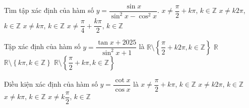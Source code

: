 \begin{ex}%
	Tìm tập  xác định của hàm số $y=\dfrac{\sin x}{\sin ^2x-\cos ^2x}$.
	\choice 
		{$x\ne \dfrac{\pi}{2}+k\pi$,  $k\in \mathbb{Z}$}
		 {$x\ne k2\pi$, $k\in \mathbb{Z}$}
		{$x\ne k\pi$,  $k\in \mathbb{Z}$}
		{\True $x\ne \dfrac{\pi}{4}+\dfrac{k\pi}{2}$, $k\in \mathbb{Z}$} 
\end{ex}

\begin{ex}%
	Tập  xác định của hàm số $y=\dfrac{\tan x+2025}{\sin ^2x+1}$ là
	\choice 
		 {$\mathbb{R}\setminus \left\{\dfrac{\pi}{2}+k2\pi, k\in\mathbb{Z}\right\}$}
		{\True  $\mathbb{R}$}
		{$\mathbb{R}\setminus  \left\{k\pi, k\in\mathbb{Z}\right\}$}
		 {$\mathbb{R}\setminus \left\{\dfrac{\pi}{2}+k\pi, k\in \mathbb{Z}\right\}$}
\end{ex}

\begin{ex}%
	Điều kiện xác định của  hàm số $y=\dfrac{\cot x}{\cos x}$ là
	\choice 
		{$x\ne \dfrac{\pi}{2}+k\pi$, $k\in  \mathbb{Z}$}
		{$x\ne k2\pi$, $k\in \mathbb{Z}$} 
		 {$x\ne k\pi$, $k\in \mathbb{Z}$}
		{\True $x\ne  k\dfrac{\pi}{2}$, $k\in \mathbb{Z}$}
\end{ex}

